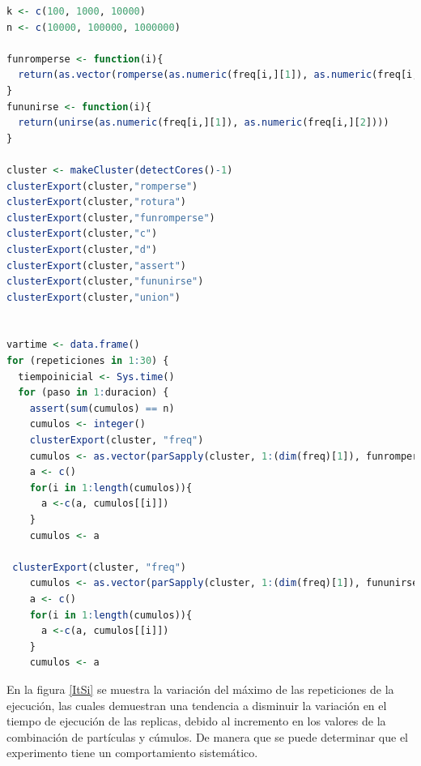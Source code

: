 \documentclass[12pt, letterpaper] {article}
\begin{document}
\begin{lstlisting}[language=R]
k <- c(100, 1000, 10000)
n <- c(10000, 100000, 1000000)

funromperse <- function(i){ 
  return(as.vector(romperse(as.numeric(freq[i,][1]), as.numeric(freq[i,][2])))) 
} 
fununirse <- function(i){ 
  return(unirse(as.numeric(freq[i,][1]), as.numeric(freq[i,][2]))) 
} 

cluster <- makeCluster(detectCores()-1) 
clusterExport(cluster,"romperse") 
clusterExport(cluster,"rotura") 
clusterExport(cluster,"funromperse") 
clusterExport(cluster,"c") 
clusterExport(cluster,"d") 
clusterExport(cluster,"assert") 
clusterExport(cluster,"fununirse") 
clusterExport(cluster,"union") 


vartime <- data.frame()
for (repeticiones in 1:30) {
  tiempoinicial <- Sys.time()
  for (paso in 1:duracion) { 
    assert(sum(cumulos) == n) 
    cumulos <- integer() 
    clusterExport(cluster, "freq") 
    cumulos <- as.vector(parSapply(cluster, 1:(dim(freq)[1]), funromperse)) 
    a <- c() 
    for(i in 1:length(cumulos)){ 
      a <-c(a, cumulos[[i]]) 
    } 
    cumulos <- a 

 clusterExport(cluster, "freq") 
    cumulos <- as.vector(parSapply(cluster, 1:(dim(freq)[1]), fununirse)) 
    a <- c() 
    for(i in 1:length(cumulos)){ 
      a <-c(a, cumulos[[i]]) 
    } 
    cumulos <- a 
\end{lstlisting}

En la figura \ref{ItSi} se muestra la variación del máximo de las repeticiones de la ejecución, las cuales demuestran una tendencia a disminuir la variación en el tiempo de ejecución de las replicas, debido al incremento en los valores de la combinación de partículas y cúmulos. De manera que se puede determinar que el experimento tiene un comportamiento sistemático. 
\end{document}
